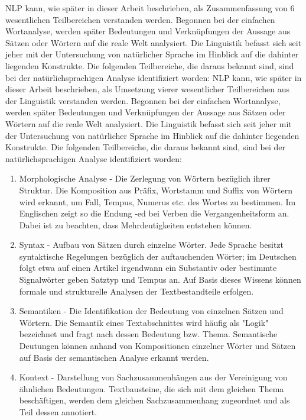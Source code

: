 \documentclass[12pt]{paper}
\begin{document}
NLP kann, wie später in dieser Arbeit beschrieben, als Zusammenfassung von 6 wesentlichen Teilbereichen verstanden werden. Begonnen bei der einfachen Wortanalyse, werden später Bedeutungen und Verknüpfungen der Aussage aus Sätzen oder Wörtern auf die reale Welt analysiert. Die Linguistik befasst sich seit jeher mit der Untersuchung von natürlicher Sprache im Hinblick auf die dahinter liegenden Konstrukte. Die folgenden Teilbereiche, die daraus bekannt sind, sind bei der natürlichsprachigen Analyse identifiziert worden:
NLP kann, wie später in dieser Arbeit beschrieben, als Umsetzung vierer wesentlicher Teilbereichen aus der Linguistik verstanden werden. Begonnen bei der einfachen Wortanalyse, werden später Bedeutungen und Verknüpfungen der Aussage aus Sätzen oder Wörtern auf die reale Welt analysiert. Die Linguistik befasst sich seit jeher mit der Untersuchung von natürlicher Sprache im Hinblick auf die dahinter liegenden Konstrukte. Die folgenden Teilbereiche, die daraus bekannt sind, sind bei der natürlichsprachigen Analyse identifiziert worden:

\begin{enumerate}
\item
Morphologische Analyse - Die Zerlegung von Wörtern bezüglich ihrer Struktur. Die Komposition aus Präfix, Wortstamm und Suffix von Wörtern wird erkannt, um Fall, Tempus, Numerus etc. des Wortes zu bestimmen. Im Englischen zeigt so die Endung -ed bei Verben die Vergangenheitsform an. Dabei ist zu beachten, dass Mehrdeutigkeiten entstehen können.
\item
Syntax - Aufbau von Sätzen durch einzelne Wörter. Jede Sprache besitzt syntaktische Regelungen bezüglich der auftauchenden Wörter; im Deutschen folgt etwa auf einen Artikel irgendwann ein Substantiv oder bestimmte Signalwörter geben Satztyp und Tempus an. Auf Basis dieses Wissens können formale und strukturelle Analysen der Textbestandteile erfolgen.
\item
Semantiken - Die Identifikation der Bedeutung von einzelnen Sätzen und Wörtern. Die Semantik eines Textabschnittes wird häufig als "Logik" bezeichnet und fragt nach dessen Bedeutung bzw. Thema. Semantische Deutungen können anhand von Kompositionen einzelner Wörter und Sätzen auf Basis der semantischen Analyse erkannt werden.
\item
Kontext - Darstellung von Sachzusammenhängen aus der Vereinigung von ähnlichen Bedeutungen. Textbausteine, die sich mit dem gleichen Thema beschäftigen, werden dem gleichen Sachzusammenhang zugeordnet und als Teil dessen annotiert.
\end{enumerate}
\end{document}
